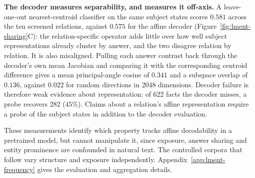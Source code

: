 \textbf{The decoder measures separability, and measures it off-axis.}
A leave-one-out nearest-centroid classifier on the same subject states scores
$0.581$ across the ten screened relations, against $0.575$ for the affine decoder
(Figure~\ref{fig:lment-sharing}C): the relation-specific operator adds little over
how well subject representations already cluster by answer, and the two disagree
relation by relation. It is also misaligned. Pulling each answer contrast back
through the decoder's own mean Jacobian and comparing it with the corresponding
centroid difference gives a mean principal-angle cosine of $0.341$ and a subspace
overlap of $0.136$, against $0.022$ for random directions in 2048 dimensions.
Decoder failure is therefore weak evidence about representation: of 622 facts the
decoder misses, a probe recovers 282 ($45\%$). Claims about a relation's affine
representation require a probe of the subject states in addition to the decoder
evaluation.

These measurements identify which property tracks affine decodability in a
pretrained model, but cannot manipulate it, since exposure, answer sharing and
entity prominence are confounded in natural text. The controlled corpora that
follow vary structure and exposure independently.
Appendix~\ref{app:lment-frequency} gives the evaluation and aggregation details.
